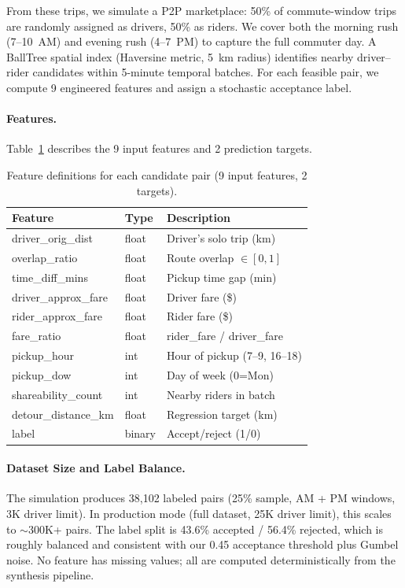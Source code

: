 \documentclass{article}
\begin{document}
From these trips, we simulate a P2P marketplace: 50\% of commute-window trips are randomly assigned as drivers, 50\% as riders. We cover both the morning rush (7--10~AM) and evening rush (4--7~PM) to capture the full commuter day. A BallTree spatial index (Haversine metric, 5~km radius) identifies nearby driver--rider candidates within 5-minute temporal batches. For each feasible pair, we compute 9 engineered features and assign a stochastic acceptance label.

\paragraph{Features.}
Table~\ref{tab:features} describes the 9 input features and 2 prediction targets.

\begin{table}[t]
\caption{Feature definitions for each candidate pair (9 input features, 2 targets).}
\label{tab:features}
\centering
\footnotesize
\begin{tabular}{@{}llp{3.0cm}@{}}
\toprule
Feature & Type & Description \\
\midrule
driver\_orig\_dist & float & Driver's solo trip (km) \\
overlap\_ratio & float & Route overlap $\in [0,1]$ \\
time\_diff\_mins & float & Pickup time gap (min) \\
driver\_approx\_fare & float & Driver fare (\$) \\
rider\_approx\_fare & float & Rider fare (\$) \\
fare\_ratio & float & rider\_fare / driver\_fare \\
pickup\_hour & int & Hour of pickup (7–9, 16–18) \\
pickup\_dow & int & Day of week (0=Mon) \\
shareability\_count & int & Nearby riders in batch \\
\midrule
detour\_distance\_km & float & Regression target (km) \\
label & binary & Accept/reject (1/0) \\
\bottomrule
\end{tabular}
\end{table}

\paragraph{Dataset Size and Label Balance.}
The simulation produces 38,102 labeled pairs (25\% sample, AM + PM windows, 3K driver limit). In production mode (full dataset, 25K driver limit), this scales to $\sim$300K+ pairs. The label split is 43.6\% accepted / 56.4\% rejected, which is roughly balanced and consistent with our 0.45 acceptance threshold plus Gumbel noise. No feature has missing values; all are computed deterministically from the synthesis pipeline.
\end{document}

